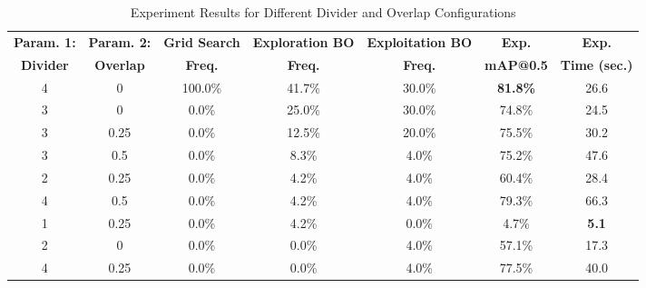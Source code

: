 \begin{table}[H]
    \centering
    \caption{Experiment Results for Different Divider and Overlap Configurations}
    \label{tab:s2_hpmap}
    \begin{tabular}{ccccccc}
        \midrule
    \textbf{Param. 1:} & \textbf{Param. 2:} & \textbf{Grid Search} & \textbf{Exploration BO} & \textbf{Exploitation BO} & \textbf{Exp.} & \textbf{Exp.} \\
    \textbf{Divider} & \textbf{Overlap} & \textbf{Freq.} & \textbf{Freq.} & \textbf{Freq.} & \textbf{mAP@0.5} & \textbf{Time (sec.)} \\
    \midrule
        4 & 0 & 100.0\% & 41.7\% & 30.0\% & \textbf{81.8\%} & 26.6 \\
        3 & 0 & 0.0\% & 25.0\% & 30.0\% & 74.8\% & 24.5 \\
        3 & 0.25 & 0.0\% & 12.5\% & 20.0\% & 75.5\% & 30.2 \\
        3 & 0.5 & 0.0\% & 8.3\% & 4.0\% & 75.2\% & 47.6 \\
        2 & 0.25 & 0.0\% & 4.2\% & 4.0\% & 60.4\% & 28.4 \\
        4 & 0.5 & 0.0\% & 4.2\% & 4.0\% & 79.3\% & 66.3 \\
        1 & 0.25 & 0.0\% & 4.2\% & 0.0\% & 4.7\% & \textbf{5.1} \\
        2 & 0 & 0.0\% & 0.0\% & 4.0\% & 57.1\% & 17.3 \\
        4 & 0.25 & 0.0\% & 0.0\% & 4.0\% & 77.5\% & 40.0 \\
        \midrule
    \end{tabular}
\end{table}